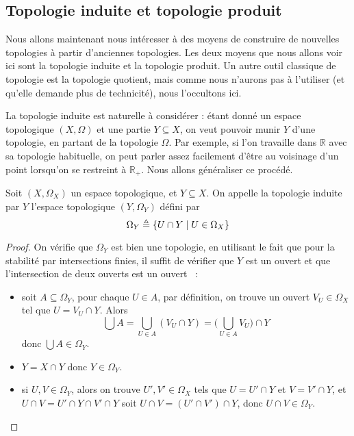 \subsection{Topologie induite et topologie produit}

Nous allons maintenant nous intéresser à des moyens de construire de nouvelles
topologies à partir d'anciennes topologies. Les deux moyens que nous allons
voir ici sont la topologie induite et la topologie produit. Un autre outil
classique de topologie est la topologie quotient, mais comme nous n'aurons pas à
l'utiliser (et qu'elle demande plus de technicité), nous l'occultons ici.

La topologie induite est naturelle à considérer : étant donné un espace
topologique $(X,\Omega)$ et une partie $Y\subseteq X$, on veut pouvoir munir $Y$
d'une topologie, en partant de la topologie $\Omega$. Par exemple, si l'on
travaille dans $\mathbb R$ avec sa topologie habituelle, on peut parler assez
facilement d'être au voisinage d'un point lorsqu'on se restreint à
$\mathbb R_+$. Nous allons généraliser ce procédé.

\begin{definition}
  Soit $(X,\Omega_X)$ un espace topologique, et $Y\subseteq X$. On appelle la
  topologie induite par $Y$ l'espace topologique $(Y,\Omega_Y)$ défini par
  \[\Omega_Y \triangleq \{U \cap Y \mid U \in \Omega_X\}\]
\end{definition}

\begin{proof}
  On vérifie que $\Omega_Y$ est bien une topologie, en utilisant le fait que
  pour la stabilité par intersections finies, il suffit de vérifier que $Y$ est
  un ouvert et que l'intersection de deux ouverts est un ouvert~ :
  \begin{itemize}
  \item soit $A\subseteq \Omega_Y$, pour chaque $U\in A$, par définition, on
    trouve un ouvert $V_U\in \Omega_X$ tel que $U = V_U \cap Y$. Alors
    \[\bigcup A = \bigcup_{U\in A} (V_U\cap Y) =
    \Bigg(\bigcup_{U\in A} V_U\Bigg)\cap Y\]
    donc $\bigcup A \in \Omega_Y$.
  \item $Y = X \cap Y$ donc $Y\in \Omega_Y$.
  \item si $U,V\in\Omega_Y$, alors on trouve $U',V'\in\Omega_X$ tels que
    $U = U'\cap Y$ et $V = V'\cap Y$, et $U\cap V = U'\cap Y \cap V'\cap Y$
    soit $U\cap V = (U'\cap V')\cap Y$, donc $U\cap V \in \Omega_Y$.
  \end{itemize}
\end{proof}

